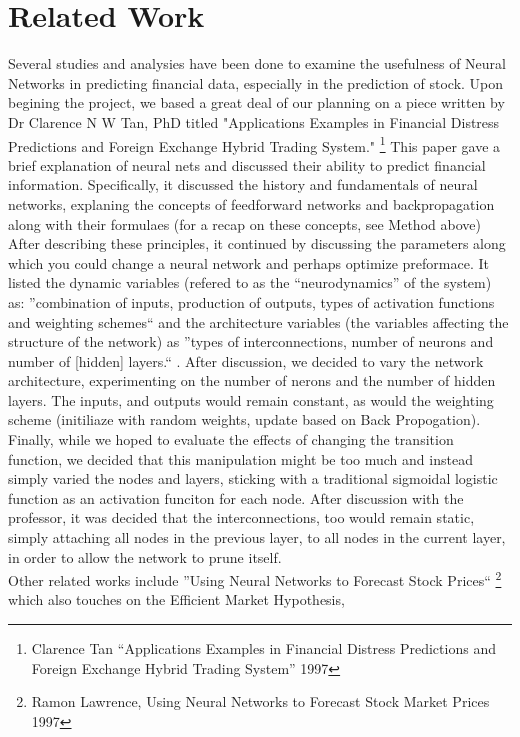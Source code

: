 \documentclass[a4paper,11pt]{article}
\begin{document}
\section{Related Work}
Several studies and analysies have been done to examine the usefulness of Neural Networks in predicting financial data, especially in the prediction of stock. Upon begining the project, we based a great deal of our planning on a piece written by Dr Clarence N W Tan, PhD titled "Applications Examples in Financial Distress Predictions and Foreign Exchange Hybrid Trading System." \footnote{Clarence Tan ``Applications Examples in Financial Distress Predictions and Foreign Exchange Hybrid Trading System'' 1997} This paper gave a brief explanation of neural nets and discussed their ability to predict financial information. Specifically, it discussed the history and fundamentals of neural networks, explaning the concepts of feedforward networks and backpropagation along with their formulaes (for a recap on these concepts, see Method above) After describing these principles, it continued by discussing the parameters along which you could change a neural network and perhaps optimize preformace. It listed the dynamic 
variables (refered to as the ``neurodynamics'' of the system) as: ''combination of inputs, production of outputs, types of activation functions and weighting schemes`` and the architecture variables (the variables affecting the structure of the network) as ''types of interconnections, number of neurons and number of [hidden] layers.`` . After discussion, we decided to vary the network architecture, experimenting on the number of nerons and the number of hidden layers. The inputs, and outputs would remain constant, as would the weighting scheme (initiliaze with random weights, update based on Back Propogation). Finally, while we hoped to evaluate the effects of changing the transition function, we decided that this manipulation might be too much and instead simply varied the nodes and layers, sticking with a traditional sigmoidal logistic function as an activation funciton for each node. After discussion with the professor, it was decided that the interconnections, too would remain static, simply attaching 
all nodes in the previous layer, to all nodes in the current layer, in order to allow the network to prune itself. \\
Other related works include ''Using Neural Networks to Forecast Stock Prices`` \footnote{Ramon Lawrence, Using Neural Networks to Forecast Stock Market Prices 1997} which also touches on the Efficient Market Hypothesis, 
\end{document}

